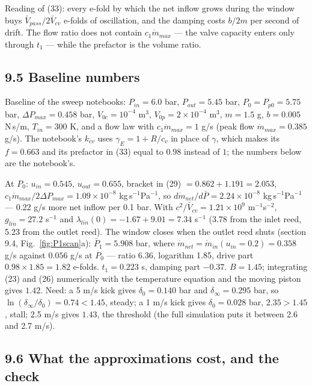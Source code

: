 Reading of (33): every e-fold by which the net inflow grows during the window buys $\bar V_{pass}/2\bar V_{cv}$ e-folds of oscillation, and the damping costs $b/2m$ per second of drift. The flow ratio does not contain $c_1\dot m_{max}$ --- the valve capacity enters only through $t_1$ --- while the prefactor is the volume ratio.

\subsection*{9.5 Baseline numbers}

Baseline of the sweep notebooks: $P_{in} = 6.0$ bar, $P_{out} = 5.45$ bar, $P_0 = P_{p0} = 5.75$ bar, $\Delta P_{max} = 0.458$ bar, $V_{0c} = 10^{-4}$ m$^3$, $V_{0p} = 2\times10^{-4}$ m$^3$, $m = 1.5$ g, $b = 0.005$ N\,s/m, $T_{in} = 300$ K, and a flow law with $c_1\dot m_{max} = 1$ g/s (peak flow $\dot m_{max} = 0.385$ g/s). The notebook's $k_{cv}$ uses $\gamma_E = 1 + R/c_v$ in place of $\gamma$, which makes its $f = 0.663$ and its prefactor in (33) equal to $0.98$ instead of $1$; the numbers below are the notebook's.

At $P_0$: $u_{in} = 0.545$, $u_{out} = 0.655$, bracket in (29) $= 0.862 + 1.191 = 2.053$, $c_1\dot m_{max}/2\Delta P_{max} = 1.09\times10^{-8}$ kg\,s$^{-1}$Pa$^{-1}$, so $d\dot m_{net}/d\bar P = 2.24\times10^{-8}$ kg\,s$^{-1}$Pa$^{-1}$ --- 0.22 g/s more net inflow per 0.1 bar. With $c^2/\bar V_{cv} = 1.21\times10^{9}$ m$^{-1}$s$^{-2}$, $g_{lin} = 27.2$ s$^{-1}$ and $\lambda_{lin}(0) = -1.67 + 9.01 = 7.34$ s$^{-1}$ (3.78 from the inlet reed, 5.23 from the outlet reed). The window closes when the outlet reed shuts (section 9.4, Fig.~\ref{fig:P1scan}a): $\bar P_1 = 5.908$ bar, where $\dot m_{net} = \dot m_{in}(u_{in} = 0.2) = 0.358$ g/s against $0.056$ g/s at $P_0$ --- ratio 6.36, logarithm 1.85, drive part $0.98\times1.85 = 1.82$ e-folds. $t_1 = 0.223$ s, damping part $-0.37$. $B = 1.45$; integrating (23) and (26) numerically with the temperature equation and the moving piston gives $1.42$. Need: a 5 m/s kick gives $\delta_0 = 0.140$ bar and $\delta_\infty = 0.295$ bar, so $\ln(\delta_\infty/\delta_0) = 0.74 < 1.45$, steady; a 1 m/s kick gives $\delta_0 = 0.028$ bar, $2.35 > 1.45$, stall; 2.5 m/s gives $1.43$, the threshold (the full simulation puts it between 2.6 and 2.7 m/s).

\subsection*{9.6 What the approximations cost, and the check}

